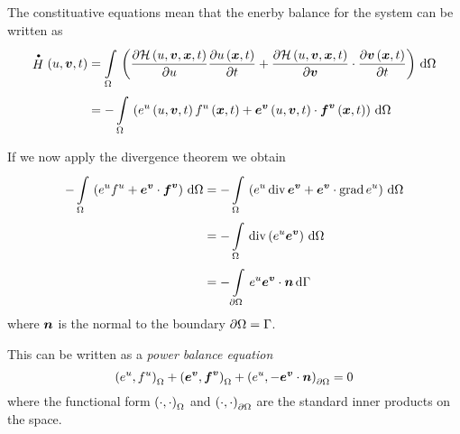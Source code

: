 The constituative equations mean that the enerby balance for the system can be
written as
\begin{equation}
  \begin{aligned}
    \dothamiltonian{u,\vectr{v},t}&=\gint{\Omega}{}{\pbrac{\delby{\hamiltoniandensity{u,\vectr{v},\vectr{x},t}}{u}\delby{\fnof{u}{\vectr{x},t}}{t}+\dotprod{\delby{\hamiltoniandensity{u,\vectr{v},\vectr{x},t}}{\vectr{v}}}{\delby{\fnof{\vectr{v}}{\vectr{x},t}}{t}}}}{\Omega}\\
    &=-\gint{\Omega}{}{\pbrac{\fnof{e^{u}}{u,\vectr{v},t}\fnof{f^{u}}{\vectr{x},t}+\dotprod{\fnof{\vectr{e}^{\vectr{v}}}{u,\vectr{v},t}}{\fnof{\vectr{f}^{\vectr{v}}}{\vectr{x},t}}}}{\Omega}
  \end{aligned}
\end{equation}

If we now apply the divergence theorem we obtain
\begin{equation}
  \begin{aligned}
    -\gint{\Omega}{}{\pbrac{e^{u}f^{u}+\dotprod{\vectr{e}^{\vectr{v}}}{\vectr{f}^{\vectr{v}}}}}{\Omega}
    &=-\gint{\Omega}{}{\pbrac{e^{u}\divop
    \vectr{e}^{\vectr{v}}+\dotprod{\vectr{e}^{\vectr{v}}}{\gradop
      e^{u}}}}{\Omega}\\
    &=-\gint{\Omega}{}{\divop\pbrac{e^{u}\vectr{e}^{\vectr{v}}}}{\Omega}\\
    &=-\gint{\boundary{\Omega}}{}{e^{u}\dotprod{\vectr{e}^{\vectr{v}}}{\vectr{n}}}{\Gamma}
  \end{aligned}
\end{equation}
where $ \boldsymbol{n} $ is the normal to the boundary $ \partial{\Omega} =\Gamma$.

This can be written as a \emph{power balance equation}
\begin{equation}
  \innerform{e^{u}}{f^{u}}{\Omega}+\innerform{\vectr{e}^{\vectr{v}}}{\vectr{f}^{\vectr{v}}}{\Omega}+\innerform{e^{u}}{-\dotprod{\vectr{e}^{\vectr{v}}}{\vectr{n}}}{\boundary{\Omega}}=0
\end{equation}
where the functional form $\innerform{\cdot}{\cdot}{\Omega}$ and
$\innerform{\cdot}{\cdot}{\boundary{\Omega}}$ are the standard inner products
on the space. 

